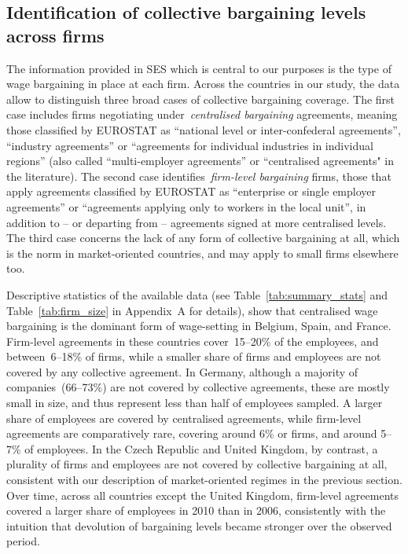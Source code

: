 \documentclass[12pt]{article}
\begin{document}
\subsection{Identification of collective bargaining levels across firms}
\label{sec:decentralisation}
The information provided in SES which is central to our purposes is the type of wage bargaining in place at each firm. Across the countries in our study, the data allow to distinguish three broad cases of collective bargaining coverage. The first case includes firms negotiating under~\emph{centralised bargaining} agreements, meaning those classified by EUROSTAT as “national level or inter-confederal agreements”, “industry agreements” or “agreements for individual industries in individual regions” (also called “multi-employer agreements” or “centralised agreements" in the literature). The second case identifies~\emph{firm-level bargaining} firms, those that apply agreements classified by EUROSTAT as “enterprise or single employer agreements” or “agreements applying only to workers in the local unit”, in addition to -- or departing from -- agreements signed at more centralised levels. The third case concerns the lack of any form of collective bargaining at all, which is the norm in market-oriented countries, and may apply to small firms elsewhere too.

Descriptive statistics of the available data (see Table~\ref{tab:summary_stats} and Table~\ref{tab:firm_size} in Appendix~A for details), show that centralised wage bargaining is the dominant form of wage-setting in Belgium, Spain, and France. Firm-level agreements in these countries cover~15--20\% of the employees, and between~6--18\% of firms, while a smaller share of firms and employees are not covered by any collective agreement. In Germany, although a majority of companies~(66--73\%) are not covered by collective agreements, these are mostly small in size, and thus represent less than half of employees sampled. A larger share of employees are covered by centralised agreements, while firm-level agreements are comparatively rare, covering around 6\% or firms, and around 5--7\% of employees. In the Czech Republic and United Kingdom, by contrast, a plurality of firms and employees are not covered by collective bargaining at all, consistent with our description of market-oriented regimes in the previous section. 
Over time, across all countries except the United Kingdom, firm-level agreements covered a larger share of employees in 2010 than in 2006, consistently with the intuition that devolution of bargaining levels became stronger over the observed period.
\end{document}
